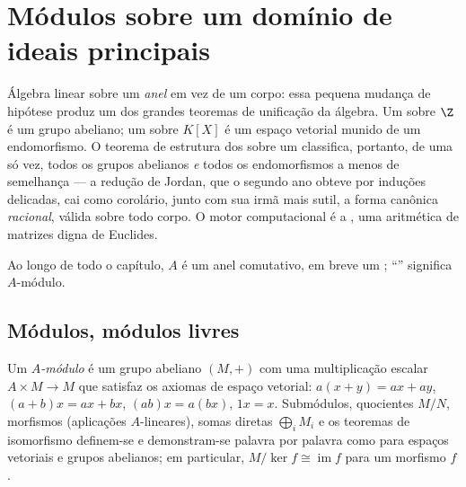 \chapter{Módulos sobre um domínio de ideais principais}\label{ch:b3:modules}

Álgebra linear sobre um \emph{anel} em vez de um corpo: essa pequena
mudança de hipótese produz um dos grandes teoremas de unificação da
álgebra. Um  sobre $\Z$ é um grupo abeliano; um  sobre
$K[X]$ é um espaço vetorial munido de um endomorfismo. O teorema de
estrutura dos  sobre um  classifica,
portanto, de uma só vez, todos os grupos abelianos 
\emph{e} todos os endomorfismos a menos de semelhança --- a redução de
Jordan, que o segundo ano obteve por induções delicadas, cai como
corolário, junto com sua irmã mais sutil, a forma canônica
\emph{racional}, válida sobre todo corpo. O motor computacional é a
, uma aritmética de matrizes digna de Euclides.

Ao longo de todo o capítulo, $A$ é um anel comutativo, em breve um
; ``'' significa $A$-módulo.

\section{Módulos, módulos livres}

\begin{definition}\label{def:b3:modules:module}
Um \emph{$A$-módulo} é um grupo abeliano $(M, +)$ com
uma multiplicação escalar $A \times M \to M$ que satisfaz os axiomas de espaço
vetorial: $a(x + y) = ax + ay$, $(a + b)x = ax + bx$, $(ab)x = a(bx)$, $1x = x$. Submódulos, quocientes
$M/N$, morfismos (aplicações $A$-lineares), somas diretas $\bigoplus_i M_i$ e
os teoremas de isomorfismo definem-se e demonstram-se palavra por
palavra como para espaços vetoriais e grupos abelianos; em particular,
$M/\ker f \cong
\operatorname{im} f$ para um morfismo $f$.
\end{definition}

